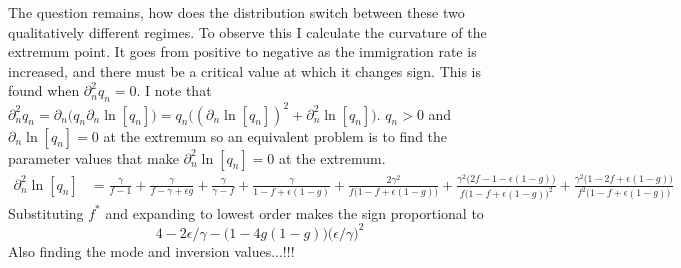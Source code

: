 The question remains, how does the distribution switch between these two qualitatively different regimes. 
To observe this I calculate the curvature of the extremum point. 
It goes from positive to negative as the immigration rate is increased, and there must be a critical value at which it changes sign. 
This is found when $\partial_n^2 q_n=0$. 
I note that $\partial_n^2 q_n=\partial_n \big(q_n \partial_n \ln[q_n] \big) = q_n \big( (\partial_n \ln[q_n])^2 + \partial_n^2 \ln[q_n] \big)$. 
$q_n>0$ and $\partial_n \ln[q_n]=0$ at the extremum so an equivalent problem is to find the parameter values that make $\partial_n^2 \ln[q_n]=0$ at the extremum. 
\begin{align*}
 \partial_n^2 \ln[q_n] &= \frac{\gamma}{f-1} + \frac{\gamma}{f-\gamma+\epsilon g} + \frac{\gamma}{\gamma-f} + \frac{\gamma}{1-f+\epsilon(1-g)} + \frac{2\gamma^2}{f\big(1-f+\epsilon(1-g)\big)} + \frac{\gamma^2\big(2f-1-\epsilon(1-g)\big)}{f\big(1-f+\epsilon(1-g)\big)^2} + \frac{\gamma^2\big(1-2f+\epsilon(1-g)\big)}{f^2\big(1-f+\epsilon(1-g)\big)}
\end{align*}
Substituting $f^*$ and expanding to lowest order makes the sign proportional to
\begin{equation*}
 4 - 2\epsilon/\gamma - \big(1-4g(1-g)\big)\big(\epsilon/\gamma\big)^2
\end{equation*}
Also finding the mode and inversion values...!!!

